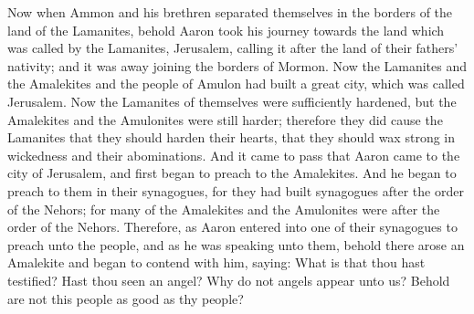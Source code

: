 \bchapter
\bverse \iffalse Now when Ammon and his brethren separated themselves in the borders of the land of the Lamanites, behold Aaron took his journey towards the land which was called by the Lamanites, Jerusalem, calling it after the land of their fathers' nativity; and it was away joining the borders of Mormon. \fi
Now when Ammon and his brethren separated themselves in the borders of the land of the Lamanites, behold Aaron took his journey towards the land which was called by the Lamanites, Jerusalem, calling it after the land of their fathers' nativity; and it was away joining the borders of Mormon.
\bverse \iffalse Now the Lamanites and the Amalekites and the people of Amulon had built a great city, which was called Jerusalem. \fi
Now the Lamanites and the Amalekites and the people of Amulon had built a great city, which was called Jerusalem.
\bverse \iffalse Now the Lamanites of themselves were sufficiently hardened, but the Amalekites and the Amulonites were still harder; therefore they did cause the Lamanites that they should harden their hearts, that they should wax strong in wickedness and their abominations. \fi
Now the Lamanites of themselves were sufficiently hardened, but the Amalekites and the Amulonites were still harder; therefore they did cause the Lamanites that they should harden their hearts, that they should wax strong in wickedness and their abominations.
\bverse \iffalse And it came to pass that Aaron came to the city of Jerusalem, and first began to preach to the Amalekites. And he began to preach to them in their synagogues, for they had built synagogues after the order of the Nehors; for many of the Amalekites and the Amulonites were after the order of the Nehors. \fi
And it came to pass that Aaron came to the city of Jerusalem, and first began to preach to the Amalekites. And he began to preach to them in their synagogues, for they had built synagogues after the order of the Nehors; for many of the Amalekites and the Amulonites were after the order of the Nehors.
\bverse \iffalse Therefore, as Aaron entered into one of their synagogues to preach unto the people, and as he was speaking unto them, behold there arose an Amalekite and began to contend with him, saying: What is that thou hast testified? Hast thou seen an angel? Why do not angels appear unto us? Behold are not this people as good as thy people? \fi
Therefore, as Aaron entered into one of their synagogues to preach unto the people, and as he was speaking unto them, behold there arose an Amalekite and began to contend with him, saying: What is that thou hast testified? Hast thou seen an angel? Why do not angels appear unto us? Behold are not this people as good as thy people?
